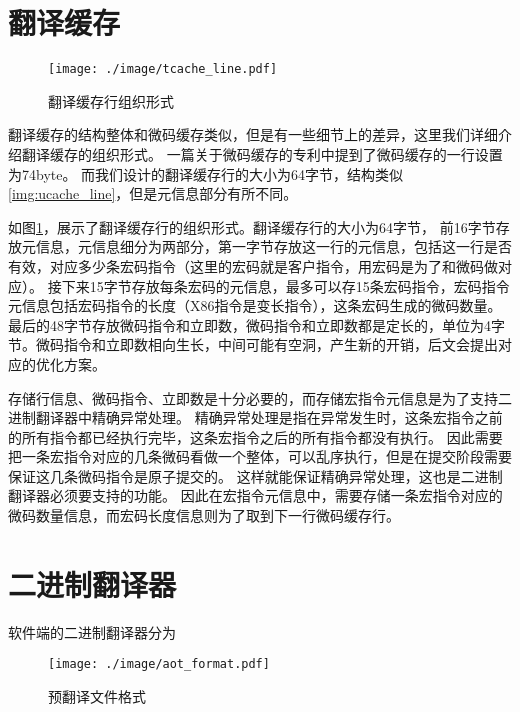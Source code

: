 \section{翻译缓存}

\begin{figure}[h]
  \centering
  \texttt{[image: ./image/tcache\_line.pdf]}
  \caption{翻译缓存行组织形式}
  \label{img:tcache_line}
\end{figure}

翻译缓存的结构整体和微码缓存类似，但是有一些细节上的差异，这里我们详细介绍翻译缓存的组织形式。
一篇关于微码缓存的专利\cite{uopPatent}中提到了微码缓存的一行设置为74byte。
而我们设计的翻译缓存行的大小为64字节，结构类似\ref{img:ucache_line}，但是元信息部分有所不同。

如图\ref{img:tcache_line}，展示了翻译缓存行的组织形式。翻译缓存行的大小为64字节，
前16字节存放元信息，元信息细分为两部分，第一字节存放这一行的元信息，包括这一行是否有效，对应多少条宏码指令（这里的宏码就是客户指令，用宏码是为了和微码做对应）。
接下来15字节存放每条宏码的元信息，最多可以存15条宏码指令，宏码指令元信息包括宏码指令的长度（X86指令是变长指令），这条宏码生成的微码数量。
最后的48字节存放微码指令和立即数，微码指令和立即数都是定长的，单位为4字节。微码指令和立即数相向生长，中间可能有空洞，产生新的开销，后文会提出对应的优化方案。

存储行信息、微码指令、立即数是十分必要的，而存储宏指令元信息是为了支持二进制翻译器中精确异常处理。
精确异常处理是指在异常发生时，这条宏指令之前的所有指令都已经执行完毕，这条宏指令之后的所有指令都没有执行。
因此需要把一条宏指令对应的几条微码看做一个整体，可以乱序执行，但是在提交阶段需要保证这几条微码指令是原子提交的。
这样就能保证精确异常处理，这也是二进制翻译器必须要支持的功能。
因此在宏指令元信息中，需要存储一条宏指令对应的微码数量信息，而宏码长度信息则为了取到下一行微码缓存行。



\section{二进制翻译器}

软件端的二进制翻译器分为

\begin{figure}[h]
  \centering
  \texttt{[image: ./image/aot\_format.pdf]}
  \caption{预翻译文件格式}
  \label{img:aot_format}
\end{figure}